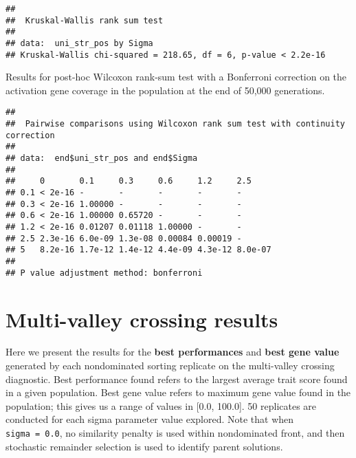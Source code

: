 \documentclass[]{book}
\newenvironment{Shaded}{\begin{snugshade}}{\end{snugshade}}
\newcommand{\DataTypeTok}[1]{\textcolor[rgb]{0.13,0.29,0.53}{#1}}
\newcommand{\KeywordTok}[1]{\textcolor[rgb]{0.13,0.29,0.53}{\textbf{#1}}}
\newcommand{\NormalTok}[1]{#1}
\newcommand{\OperatorTok}[1]{\textcolor[rgb]{0.81,0.36,0.00}{\textbf{#1}}}
\newcommand{\OtherTok}[1]{\textcolor[rgb]{0.56,0.35,0.01}{#1}}
\newcommand{\StringTok}[1]{\textcolor[rgb]{0.31,0.60,0.02}{#1}}
\begin{document}
\begin{verbatim}
## 
##  Kruskal-Wallis rank sum test
## 
## data:  uni_str_pos by Sigma
## Kruskal-Wallis chi-squared = 218.65, df = 6, p-value < 2.2e-16
\end{verbatim}

Results for post-hoc Wilcoxon rank-sum test with a Bonferroni correction on the activation gene coverage in the population at the end of 50,000 generations.

\begin{Shaded}
\end{Shaded}

\begin{verbatim}
## 
##  Pairwise comparisons using Wilcoxon rank sum test with continuity correction 
## 
## data:  end$uni_str_pos and end$Sigma 
## 
##     0       0.1     0.3     0.6     1.2     2.5    
## 0.1 < 2e-16 -       -       -       -       -      
## 0.3 < 2e-16 1.00000 -       -       -       -      
## 0.6 < 2e-16 1.00000 0.65720 -       -       -      
## 1.2 < 2e-16 0.01207 0.01118 1.00000 -       -      
## 2.5 2.3e-16 6.0e-09 1.3e-08 0.00084 0.00019 -      
## 5   8.2e-16 1.7e-12 1.4e-12 4.4e-09 4.3e-12 8.0e-07
## 
## P value adjustment method: bonferroni
\end{verbatim}

\hypertarget{multi-valley-crossing-results-5}{%
\section{Multi-valley crossing results}\label{multi-valley-crossing-results-5}}

Here we present the results for the \textbf{best performances} and \textbf{best gene value} generated by each nondominated sorting replicate on the multi-valley crossing diagnostic.
Best performance found refers to the largest average trait score found in a given population.
Best gene value refers to maximum gene value found in the population; this gives us a range of values in {[}0.0, 100.0{]}.
50 replicates are conducted for each sigma parameter value explored.
Note that when \texttt{sigma\ =\ 0.0}, no similarity penalty is used within nondominated front, and then stochastic remainder selection is used to identify parent solutions.
\end{document}

